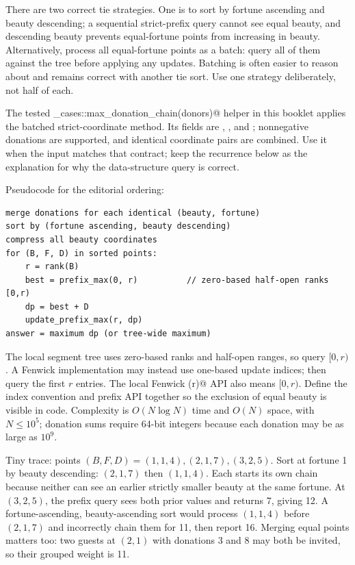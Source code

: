 There are two correct tie strategies. One is to sort by fortune ascending
and beauty descending; a sequential strict-prefix query cannot see equal
beauty, and descending beauty prevents equal-fortune points from increasing
in beauty. Alternatively, process all equal-fortune points as a batch: query
all of them against the tree before applying any updates.
Batching is often easier to reason about and remains correct with another
tie sort. Use one strategy deliberately, not half of each.

The tested \verb@finals_cases::max_donation_chain(donors)@ helper in this
booklet applies the batched strict-coordinate method. Its \verb@Donor@
fields are \verb@wealth@, \verb@beauty@, and \verb@donation@; nonnegative
donations are supported, and identical coordinate pairs are combined.
\columnbreak
{}
Use it when the input matches that contract; keep the recurrence below as
the explanation for why the data-structure query is correct.

Pseudocode for the editorial ordering:
\begin{lstlisting}
merge donations for each identical (beauty, fortune)
sort by (fortune ascending, beauty descending)
compress all beauty coordinates
for (B, F, D) in sorted points:
    r = rank(B)
    best = prefix_max(0, r)          // zero-based half-open ranks [0,r)
    dp = best + D
    update_prefix_max(r, dp)
answer = maximum dp (or tree-wide maximum)
\end{lstlisting}

The local segment tree uses zero-based ranks and half-open ranges, so query
$[0,r)$. A Fenwick implementation may instead use one-based update indices;
then query the first $r$ entries. The local Fenwick \verb@prefix(r)@ API
also means $[0,r)$. Define the index convention and prefix API together so
the exclusion of equal beauty is visible in code. Complexity is $O(N\log N)$ time and $O(N)$
space, with $N\le10^5$; donation sums require 64-bit integers because each
donation may be as large as $10^9$.

Tiny trace: points $(B,F,D)=(1,1,4),(2,1,7),(3,2,5)$. Sort at fortune 1 by
beauty descending: $(2,1,7)$ then $(1,1,4)$. Each starts its own chain because
neither can see an earlier strictly smaller beauty at the same fortune. At
$(3,2,5)$, the prefix query sees both prior values and returns 7, giving 12.
A fortune-ascending, beauty-ascending sort would process $(1,1,4)$ before
$(2,1,7)$ and incorrectly chain them for 11, then report 16. Merging equal
points matters too: two guests at $(2,1)$ with donations 3 and 8 may both be
invited, so their grouped weight is 11.


